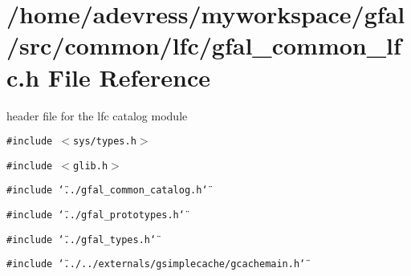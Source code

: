 \section{/home/adevress/myworkspace/gfal/src/common/lfc/gfal\_\-common\_\-lfc.h File Reference}
\label{gfal__common__lfc_8h}
header file for the lfc catalog module 

{\tt \#include $<$sys/types.h$>$}\par
{\tt \#include $<$glib.h$>$}\par
{\tt \#include \char`\"{}../gfal\_\-common\_\-catalog.h\char`\"{}}\par
{\tt \#include \char`\"{}../gfal\_\-prototypes.h\char`\"{}}\par
{\tt \#include \char`\"{}../gfal\_\-types.h\char`\"{}}\par
{\tt \#include \char`\"{}../../externals/gsimplecache/gcachemain.h\char`\"{}}\par
